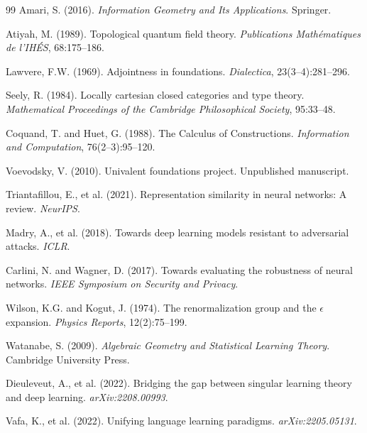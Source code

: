 \documentclass[12pt,a4paper]{article}
\theoremstyle{plain}
\theoremstyle{definition}
\begin{document}
\begin{thebibliography}{99}
 Amari, S. (2016). \textit{Information Geometry and Its
Applications}. Springer.

 Atiyah, M. (1989). Topological quantum field theory.
\textit{Publications Math\'ematiques de l'IH\'ES}, 68:175--186.

 Lawvere, F.W. (1969). Adjointness in foundations.
\textit{Dialectica}, 23(3--4):281--296.

 Seely, R. (1984). Locally cartesian closed categories and
type theory. \textit{Mathematical Proceedings of the Cambridge Philosophical
Society}, 95:33--48.

 Coquand, T. and Huet, G. (1988). The Calculus of
Constructions. \textit{Information and Computation}, 76(2--3):95--120.

 Voevodsky, V. (2010). Univalent foundations project.
Unpublished manuscript.

 Triantafillou, E., et al. (2021). Representation
similarity in neural networks: A review. \textit{NeurIPS}.

 Madry, A., et al. (2018). Towards deep learning models
resistant to adversarial attacks. \textit{ICLR}.

 Carlini, N. and Wagner, D. (2017). Towards evaluating
the robustness of neural networks. \textit{IEEE Symposium on Security and
Privacy}.

 Wilson, K.G. and Kogut, J. (1974). The renormalization
group and the $\epsilon$ expansion. \textit{Physics Reports}, 12(2):75--199.

 Watanabe, S. (2009). \textit{Algebraic Geometry and
Statistical Learning Theory}. Cambridge University Press.

 Dieuleveut, A., et al. (2022). Bridging the gap
between singular learning theory and deep learning. \textit{arXiv:2208.00993}.

 Vafa, K., et al. (2022). Unifying language learning
paradigms. \textit{arXiv:2205.05131}.

\end{thebibliography}
\end{document}
